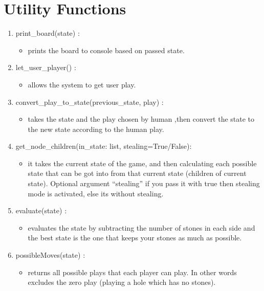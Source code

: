 \chapter{Utility Functions}
\begin{enumerate}
    \item print\_board(state) :
    \begin{itemize}
        \item prints the board to console based on passed state.
    \end{itemize}
    \item let\_user\_player() :
    \begin{itemize}
        \item allows the system to get user play.
    \end{itemize}
    \item convert\_play\_to\_state(previous\_state, play) : 
    \begin{itemize}
        \item takes the state and the play chosen by human ,then convert the state to the new state according to the human play.  
    \end{itemize}
    \vskip 0.5in
    \item get\_node\_children(in\_state: list, stealing=True/False):  
    \begin{itemize}
    \item it takes the current state of the game, and then calculating each possible state that can be
     got into from that current state (children of current state). Optional argument “stealing” if you 
     pass it with true then stealing mode is activated, else its without stealing.
    \end{itemize}
    \vskip 0.1in
    \item evaluate(state)  :
    \begin{itemize}
        \item evaluates the state by subtracting the number of stones in each side and the best state
         is the one that keeps your stones as much as possible.  
    \end{itemize}
    \item possibleMoves(state) :
    \begin{itemize}
        \item returns all possible plays that each player can play. In other words excludes
         the zero play (playing a hole which has no stones).
    \end{itemize}




\end{enumerate}
